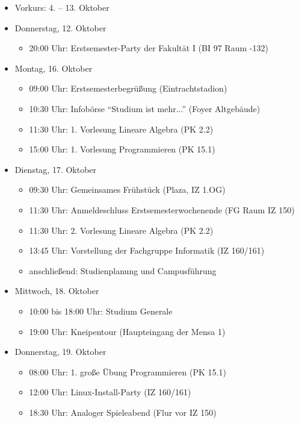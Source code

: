 \begin{itemize}
	\item Vorkurs: 4. – 13. Oktober
	\item Donnerstag, 12. Oktober
	\begin{itemize}
		\item 20:00 Uhr: Erstsemester-Party der Fakultät I (BI 97 Raum -132)
	\end{itemize}
	\item Montag, 16. Oktober
	\begin{itemize}
		\item 09:00 Uhr: Erstsemesterbegrüßung (Eintrachtstadion)
        \item 10:30 Uhr: Infobörse \enquote{Studium ist mehr...} (Foyer Altgebäude)
        \item 11:30 Uhr: 1. Vorlesung Lineare Algebra (PK 2.2)
        \item 15:00 Uhr: 1. Vorlesung Programmieren (PK 15.1)
	\end{itemize}
	\item Dienstag, 17. Oktober
	\begin{itemize}
		\item 09:30 Uhr: Gemeinsames Frühstück (Plaza, IZ 1.OG)
        \item 11:30 Uhr: Anmeldeschluss Erstsemesterwochenende (FG Raum IZ 150)
        \item 11:30 Uhr: 2. Vorlesung Lineare Algebra (PK 2.2)
        \item 13:45 Uhr: Vorstellung der Fachgruppe Informatik (IZ 160/161)
        \item anschließend: Studienplanung und Campusführung
	\end{itemize}
	\item Mittwoch, 18. Oktober
	\begin{itemize}
		\item 10:00 bis 18:00 Uhr: Studium Generale
        \item 19:00 Uhr: Kneipentour (Haupteingang der Mensa 1)
	\end{itemize}
	\item Donnerstag, 19. Oktober
	\begin{itemize}
		\item 08:00 Uhr: 1. große Übung Programmieren (PK 15.1)
        \item 12:00 Uhr: Linux-Install-Party (IZ 160/161)
        \item 18:30 Uhr: Analoger Spieleabend (Flur vor IZ 150)
	\end{itemize}

\end{itemize}
